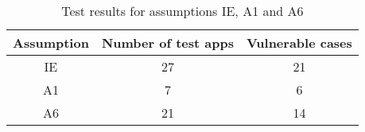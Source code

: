 \begin{table}[t]
\begin{center}
\begin{threeparttable}
\begin{tabular}{|c|c|c|}
\hline
Assumption & Number of test apps & Vulnerable cases \\
\hline
IE & 27 & 21\\
\hline
A1 & 7 & 6\\
\hline
A6 & 21 & 14\\
\hline
\end{tabular}
\end{threeparttable}
\end{center}
\caption{Test results for assumptions IE, A1 and A6}
\label{tab:explicating_test_results}
\end{table}